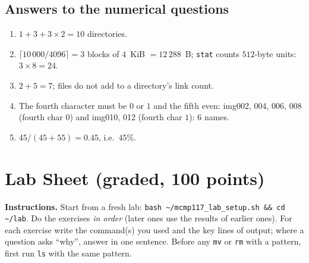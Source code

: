 \documentclass[11pt,a4paper]{article}
\newcommand{\cmd}[1]{\texttt{#1}}
\begin{document}
\subsection*{Answers to the numerical questions}
\begin{enumerate}[leftmargin=1.6em,start=7]
  \item $1 + 3 + 3 \times 2 = 10$ directories.
  \item $\lceil 10\,000 / 4096 \rceil = 3$ blocks of $4$~KiB $= 12\,288$~B; \cmd{stat} counts $512$-byte units: $3 \times 8 = 24$.
  \item $2 + 5 = 7$; files do not add to a directory's link count.
  \item The fourth character must be $0$ or $1$ and the fifth even: img002, 004, 006, 008 (fourth char $0$) and img010, 012 (fourth char $1$): $6$ names.
  \item $45/(45+55) = 0.45$, i.e.\ $45\%$.
\end{enumerate}

\section{Lab Sheet (graded, 100 points)}
\label{sec:lab}

\textbf{Instructions.} Start from a fresh lab: \cmd{bash \textasciitilde/mcmp117\_lab\_setup.sh \&\& cd \textasciitilde/lab}. Do the exercises \emph{in order} (later ones use the results of earlier ones). For each exercise write the command(s) you used and the key lines of output; where a question asks ``why'', answer in one sentence. Before any \cmd{mv} or \cmd{rm} with a pattern, first run \cmd{ls} with the same pattern.
\end{document}
